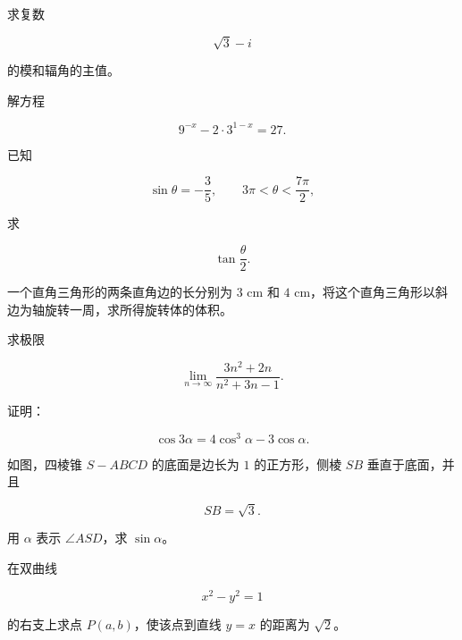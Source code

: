 \begin{question}
求复数

\nopagebreak[4]
\[
\sqrt3-i
\]

的模和辐角的主值。

\end{question}
\begin{question}
解方程

\nopagebreak[4]
\[
9^{-x}-2\cdot3^{1-x}=27.
\]

\end{question}
\begin{question}
已知

\nopagebreak[4]
\[
\sin\theta=-\frac35,\qquad
3\pi<\theta<\frac{7\pi}{2},
\]

求

\nopagebreak[4]
\[
\tan\frac\theta2.
\]

\end{question}
\begin{question}
一个直角三角形的两条直角边的长分别为 $3\text{ cm}$ 和 $4\text{ cm}$，将这个直角三角形以斜边为轴旋转一周，求所得旋转体的体积。

\end{question}
\begin{question}
求极限

\nopagebreak[4]
\[
\lim_{n\to\infty}\frac{3n^2+2n}{n^2+3n-1}.
\]

\end{question}
\begin{question}
证明：

\nopagebreak[4]
\[
\cos3\alpha=4\cos^3\alpha-3\cos\alpha.
\]

\Needspace{0.4\textheight}
\end{question}
\begin{question}
如图，四棱锥 $S-ABCD$ 的底面是边长为 $1$ 的正方形，侧棱 $SB$ 垂直于底面，并且

\nopagebreak[4]
\[
SB=\sqrt3.
\]

用 $\alpha$ 表示 $\angle ASD$，求 $\sin\alpha$。
\nopagebreak[4]
\begin{center}\end{center}
\nopagebreak[4]
\end{question}
\begin{question}
在双曲线

\nopagebreak[4]
\[
x^2-y^2=1
\]

的右支上求点 $P(a,b)$，使该点到直线 $y=x$ 的距离为 $\sqrt2$。

\end{question}

